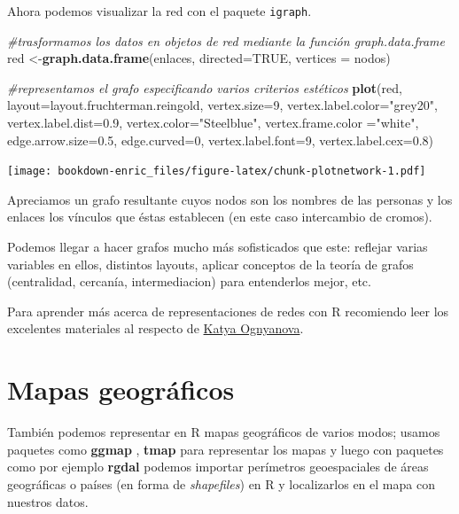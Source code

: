 \documentclass[]{book}
\newenvironment{Shaded}{\begin{snugshade}}{\end{snugshade}}
\newcommand{\KeywordTok}[1]{\textcolor[rgb]{0.13,0.29,0.53}{\textbf{{#1}}}}
\newcommand{\DataTypeTok}[1]{\textcolor[rgb]{0.13,0.29,0.53}{{#1}}}
\newcommand{\DecValTok}[1]{\textcolor[rgb]{0.00,0.00,0.81}{{#1}}}
\newcommand{\FloatTok}[1]{\textcolor[rgb]{0.00,0.00,0.81}{{#1}}}
\newcommand{\StringTok}[1]{\textcolor[rgb]{0.31,0.60,0.02}{{#1}}}
\newcommand{\CommentTok}[1]{\textcolor[rgb]{0.56,0.35,0.01}{\textit{{#1}}}}
\newcommand{\OtherTok}[1]{\textcolor[rgb]{0.56,0.35,0.01}{{#1}}}
\newcommand{\NormalTok}[1]{{#1}}
\theoremstyle{definition}
\theoremstyle{definition}
\theoremstyle{remark}
\begin{document}
Ahora podemos visualizar la red con el paquete \texttt{igraph}.

\begin{Shaded}
\begin{Highlighting}[]
\CommentTok{#trasformamos los datos en objetos de red mediante la función graph.data.frame}
\NormalTok{red <-}\KeywordTok{graph.data.frame}\NormalTok{(enlaces, }\DataTypeTok{directed=}\OtherTok{TRUE}\NormalTok{, }\DataTypeTok{vertices =} \NormalTok{nodos)}

\CommentTok{#representamos el grafo especificando varios criterios estéticos}
\KeywordTok{plot}\NormalTok{(red, }\DataTypeTok{layout=}\NormalTok{layout.fruchterman.reingold, }\DataTypeTok{vertex.size=}\DecValTok{9}\NormalTok{, }
     \DataTypeTok{vertex.label.color=}\StringTok{"grey20"}\NormalTok{, }\DataTypeTok{vertex.label.dist=}\FloatTok{0.9}\NormalTok{, }
     \DataTypeTok{vertex.color=}\StringTok{"Steelblue"}\NormalTok{, }\DataTypeTok{vertex.frame.color =}\StringTok{"white"}\NormalTok{, }
     \DataTypeTok{edge.arrow.size=}\FloatTok{0.5}\NormalTok{, }\DataTypeTok{edge.curved=}\DecValTok{0}\NormalTok{, }\DataTypeTok{vertex.label.font=}\DecValTok{9}\NormalTok{, }
     \DataTypeTok{vertex.label.cex=}\FloatTok{0.8}\NormalTok{)}
\end{Highlighting}
\end{Shaded}

\texttt{[image: bookdown-enric\_files/figure-latex/chunk-plotnetwork-1.pdf]}

Apreciamos un grafo resultante cuyos nodos son los nombres de las
personas y los enlaces los vínculos que éstas establecen (en este caso
intercambio de cromos).

Podemos llegar a hacer grafos mucho más sofisticados que este: reflejar
varias variables en ellos, distintos layouts, aplicar conceptos de la
teoría de grafos (centralidad, cercanía, intermediacion) para
entenderlos mejor, etc.

Para aprender más acerca de representaciones de redes con R recomiendo
leer los excelentes materiales al respecto de
\href{http://kateto.net/}{Katya Ognyanova}.

\section{Mapas geográficos}\label{mapas-geograficos}

También podemos representar en R mapas geográficos de varios modos;
usamos paquetes como \textbf{ggmap} \citep{R-ggmap}, \textbf{tmap}
\citep{R-tmap} para representar los mapas y luego con paquetes como por
ejemplo \textbf{rgdal} \citep{R-rgdal} podemos importar perímetros
geoespaciales de áreas geográficas o países (en forma de
\emph{shapefiles}) en R y localizarlos en el mapa con nuestros datos.
\end{document}
